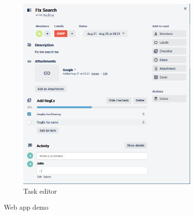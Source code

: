 \begin{figure}[h]
\ContinuedFloat
\begin{subfigure}{.5\textwidth}
  \centering
  \includegraphics[width=2\linewidth]{taskeditor.png}
  \caption{Task editor}
  \label{fig:sfig1}
\end{subfigure}%
\caption{Web app demo}
\label{fig:fig}
\end{figure}